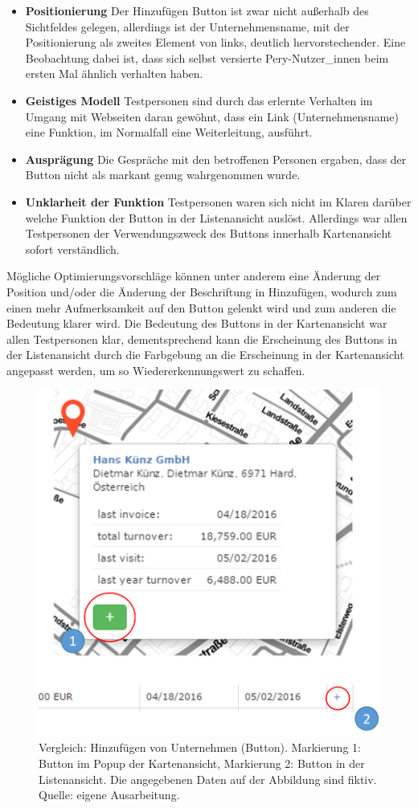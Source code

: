 \documentclass[Bachelorarbeit.tex]{subfiles}
\begin{document}
\begin{itemize}
	\item \textbf{Positionierung} Der Hinzufügen Button ist zwar nicht außerhalb des Sichtfeldes gelegen, allerdings ist der Unternehmensname, mit der Positionierung als zweites Element von links, deutlich hervorstechender. Eine Beobachtung dabei ist, dass sich selbst versierte Pery-Nutzer\_innen beim ersten Mal ähnlich verhalten haben.
	\item \textbf{Geistiges Modell} Testpersonen sind durch das erlernte Verhalten im Umgang mit Webseiten daran gewöhnt, dass ein Link (Unternehmensname) eine Funktion, im Normalfall eine Weiterleitung, ausführt.
	\item \textbf{Ausprägung} Die Gespräche mit den betroffenen Personen ergaben, dass der Button nicht als markant genug wahrgenommen wurde.
	\item \textbf{Unklarheit der Funktion} Testpersonen waren sich nicht im Klaren darüber welche Funktion der Button in der Listenansicht auslöst. Allerdings war allen Testpersonen der Verwendungszweck des Buttons innerhalb Kartenansicht sofort verständlich.
\end{itemize}
Mögliche Optimierungsvorschläge können unter anderem eine Änderung der Position und/oder die Änderung der Beschriftung in Hinzufügen, wodurch zum einen mehr Aufmerksamkeit auf den Button gelenkt wird und zum anderen die Bedeutung klarer wird. Die Bedeutung des Buttons in der Kartenansicht war allen Testpersonen klar, dementsprechend kann die Erscheinung des Buttons in der Listenansicht durch die Farbgebung an die Erscheinung in der Kartenansicht angepasst werden, um so Wiedererkennungswert zu schaffen.

\begin{figure}[h]
	\centering
	\includegraphics[width=0.7\linewidth]{img/Evaluation/Userfeedback/Add}
	\caption[Vergleich: Button Karte- und Listenansicht]{Vergleich: Hinzufügen von Unternehmen (Button). Markierung 1: Button im Popup der Kartenansicht, Markierung 2: Button in der Listenansicht. Die angegebenen Daten auf der Abbildung sind fiktiv. Quelle: eigene Ausarbeitung.}
	\label{fig:Add}
\end{figure}
\end{document}
